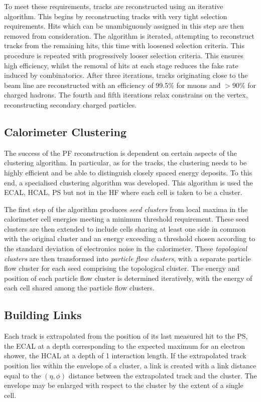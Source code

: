 To meet these requirements, tracks are reconstructed using an iterative
algorithm. This begins by reconstructing tracks with very tight selection
requirements. Hits which can be unambiguously assigned in this step are then
removed from consideration. The algorithm is iterated, attempting to reconstruct
tracks from the remaining hits, this time with loosened selection criteria. This
procedure is repeated with progressively looser selection criteria. This ensures
high efficiency, whilst the removal of hits at each stage reduces the fake rate
induced by combinatorics.  After three iterations, tracks originating close to
the beam line are reconstructed with an efficiency of 99.5\% for muons and
$>90\%$ for charged hadrons. The fourth and fifth iterations relax constrains on
the vertex, reconstructing secondary charged particles.

\subsection{Calorimeter Clustering}
The success of the \ac{PF} reconstruction is dependent on certain aspects of the
clustering algorithm. In particular, as for the tracks, the clustering needs to
be highly efficient and be able to distinguish closely spaced energy deposits.
To this end, a specialised clustering algorithm was developed. This algorithm is
used the \ac{ECAL}, \ac{HCAL}, \ac{PS} but not in the \ac{HF} where each cell is
taken to be a cluster.

The first step of the algorithm produces \emph{seed clusters} from local maxima
in the calorimeter cell energies meeting a minimum threshold requirement.  These
seed clusters are then extended to include cells sharing at least one side in
common with the original cluster and an energy exceeding a threshold chosen
according to the standard deviation of electronics noise in the
calorimeter. These \emph{topological clusters} are then transformed into
\emph{particle flow clusters}, with a separate particle flow cluster for each
seed comprising the topological cluster. The energy and position of each
particle flow cluster is determined iteratively, with the energy of each cell
shared among the particle flow clusters.

\subsection{Building Links}
Each track is extrapolated from the position of its last measured hit to the
\ac{PS}, the \ac{ECAL} at a depth corresponding to the expected maximum for an
electron shower, the \ac{HCAL} at a depth of 1 interaction length. If the
extrapolated track position lies within the envelope of a cluster, a link is
created with a link distance equal to the $(\eta, \phi)$ distance between the
extrapolated track and the cluster. The envelope may be enlarged with respect to
the cluster by the extent of a single cell.

